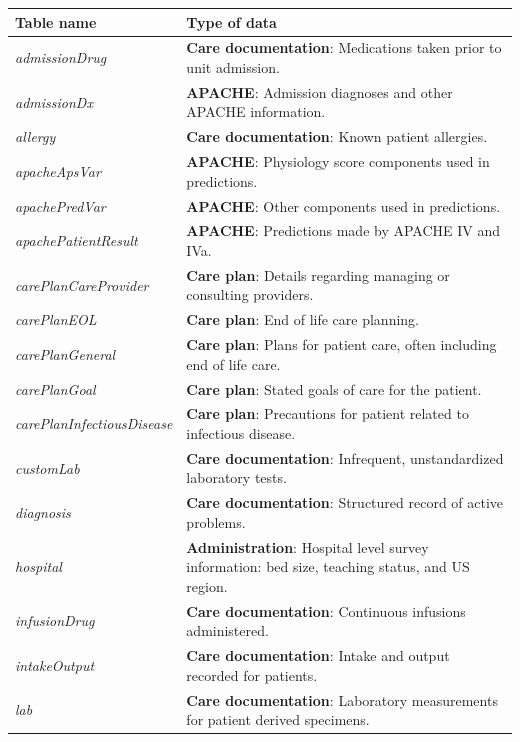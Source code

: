 \documentclass[english]{article}
\newcommand{\tblname}[1]{\emph{#1}}
\begin{document}

\begin{center}
\begin{table}
\begin{tabular}{p{4.4cm}|p{10.5cm}}
Table name & Type of data  \\\hline
  \tblname{admissionDrug} & \textbf{Care documentation}: Medications taken prior to unit admission.  \\
  \tblname{admissionDx} & \textbf{APACHE}: Admission diagnoses and other APACHE information.  \\
  \tblname{allergy} & \textbf{Care documentation}: Known patient allergies.  \\
  \tblname{apacheApsVar} & \textbf{APACHE}: Physiology score components used in predictions.  \\
  \tblname{apachePredVar} & \textbf{APACHE}: Other components used in predictions.  \\
  \tblname{apachePatientResult} & \textbf{APACHE}: Predictions made by APACHE IV and IVa.  \\
  \tblname{carePlanCareProvider} & \textbf{Care plan}: Details regarding managing or consulting providers. \\
  \tblname{carePlanEOL} & \textbf{Care plan}: End of life care planning. \\
  \tblname{carePlanGeneral} & \textbf{Care plan}: Plans for patient care, often including end of life care. \\
  \tblname{carePlanGoal} & \textbf{Care plan}: Stated goals of care for the patient.  \\
  \tblname{carePlanInfectiousDisease} & \textbf{Care plan}: Precautions for patient related to infectious disease.  \\
  \tblname{customLab}   &  \textbf{Care documentation}: Infrequent, unstandardized laboratory tests. \\
  \tblname{diagnosis} &  \textbf{Care documentation}: Structured record of active problems. \\
  \tblname{hospital}  & \textbf{Administration}: Hospital level survey information: bed size, teaching status, and US region.  \\
  \tblname{infusionDrug} &  \textbf{Care documentation}: Continuous infusions administered.  \\
  \tblname{intakeOutput} &  \textbf{Care documentation}: Intake and output recorded for patients. \\
  \tblname{lab} &  \textbf{Care documentation}: Laboratory measurements for patient derived specimens. \\

\end{tabular}
\end{table}
\end{center}
\end{document}
